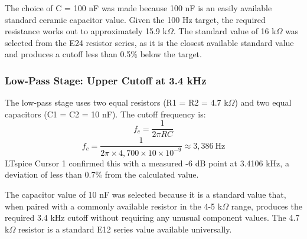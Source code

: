 The choice of C = 100 nF was made because 100 nF is an easily available standard ceramic capacitor value. Given the 100 Hz target, the required resistance works out to approximately 15.9 k$\Omega$. The standard value of 16 k$\Omega$ was selected from the E24 resistor series, as it is the closest available standard value and produces a cutoff less than 0.5\% below the target.

\subsubsection{Low-Pass Stage: Upper Cutoff at 3.4 kHz}

The low-pass stage uses two equal resistors (R1 = R2 = 4.7 k$\Omega$) and two equal capacitors (C1 = C2 = 10 nF). The cutoff frequency is:
\[
f_c = \frac{1}{2\pi RC}
\]
\[
f_c = \frac{1}{2\pi \times 4,\!700 \times 10 \times 10^{-9}} \approx 3,\!386~\text{Hz}
\]
LTspice Cursor 1 confirmed this with a measured -6 dB point at 3.4106 kHz, a deviation of less than 0.7\% from the calculated value.

The capacitor value of 10 nF was selected because it is a standard value that, when paired with a commonly available resistor in the 4-5 k$\Omega$ range, produces the required 3.4 kHz cutoff without requiring any unusual component values. The 4.7 k$\Omega$ resistor is a standard E12 series value available universally.








